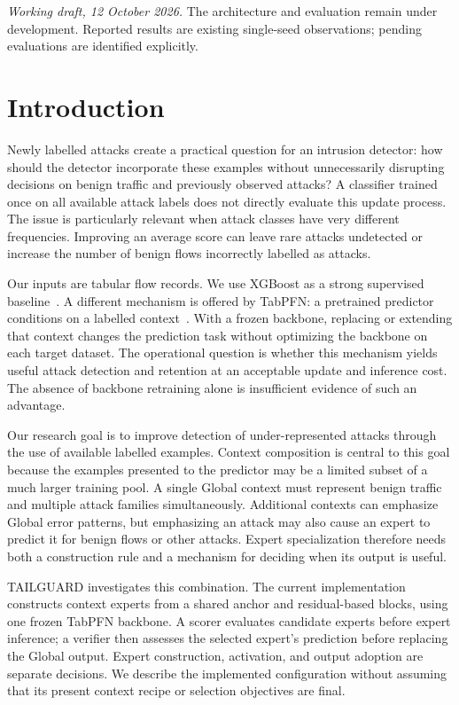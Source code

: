 \documentclass[sigconf,anonymous,pbalance]{acmart}
\begin{document}
\noindent\textit{Working draft, 12 October 2026.} The architecture and evaluation remain under development. Reported results are existing single-seed observations; pending evaluations are identified explicitly.

\section{Introduction}
\label{sec:intro}
Newly labelled attacks create a practical question for an intrusion detector: how should the detector incorporate these examples without unnecessarily disrupting decisions on benign traffic and previously observed attacks? A classifier trained once on all available attack labels does not directly evaluate this update process. The issue is particularly relevant when attack classes have very different frequencies. Improving an average score can leave rare attacks undetected or increase the number of benign flows incorrectly labelled as attacks.

Our inputs are tabular flow records. We use XGBoost as a strong supervised baseline~\cite{chen2016xgboost}. A different mechanism is offered by TabPFN: a pretrained predictor conditions on a labelled context~\cite{hollmann2023tabpfn,hollmann2025tabpfn}. With a frozen backbone, replacing or extending that context changes the prediction task without optimizing the backbone on each target dataset. The operational question is whether this mechanism yields useful attack detection and retention at an acceptable update and inference cost. The absence of backbone retraining alone is insufficient evidence of such an advantage.

Our research goal is to improve detection of under-represented attacks through the use of available labelled examples. Context composition is central to this goal because the examples presented to the predictor may be a limited subset of a much larger training pool. A single Global context must represent benign traffic and multiple attack families simultaneously. Additional contexts can emphasize Global error patterns, but emphasizing an attack may also cause an expert to predict it for benign flows or other attacks. Expert specialization therefore needs both a construction rule and a mechanism for deciding when its output is useful.

TAILGUARD investigates this combination. The current implementation constructs context experts from a shared anchor and residual-based blocks, using one frozen TabPFN backbone. A scorer evaluates candidate experts before expert inference; a verifier then assesses the selected expert's prediction before replacing the Global output. Expert construction, activation, and output adoption are separate decisions. We describe the implemented configuration without assuming that its present context recipe or selection objectives are final.
\end{document}
